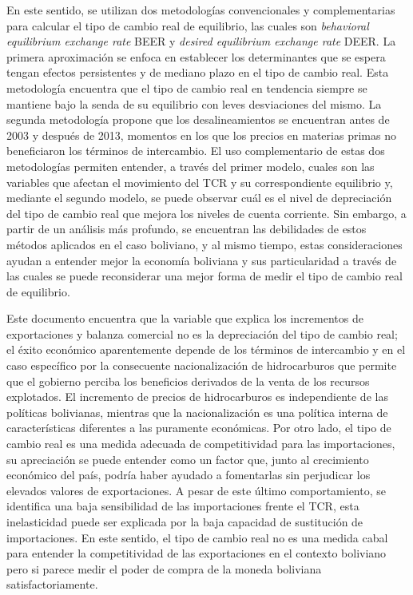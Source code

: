 \documentclass[12pt,letterpaper]{article}
\begin{document}
En este sentido, se utilizan dos metodologías convencionales y complementarias para calcular el tipo de cambio real de equilibrio, las cuales son \emph{behavioral equilibrium exchange rate} BEER y \emph{desired equilibrium exchange rate} DEER. La primera aproximación se enfoca en establecer los determinantes que se espera tengan efectos persistentes y de mediano plazo en el tipo de cambio real. Esta metodología encuentra que el tipo de cambio real en tendencia siempre se mantiene bajo la senda de su equilibrio con leves desviaciones del mismo. La segunda metodología propone que los desalineamientos se encuentran antes de 2003 y después de 2013, momentos en los que los precios en materias primas no beneficiaron los términos de intercambio. El uso complementario de estas dos metodologías permiten entender, a través del primer modelo, cuales son las variables que afectan el movimiento del TCR y su correspondiente equilibrio y, mediante el segundo modelo, se puede observar cuál es el nivel de depreciación del tipo de cambio real que mejora los niveles de cuenta corriente. Sin embargo, a partir de un análisis más profundo, se encuentran las debilidades de estos métodos aplicados en el caso boliviano, y al mismo tiempo, estas consideraciones ayudan a entender mejor la economía boliviana y sus particularidad a través de las cuales se puede reconsiderar una mejor forma de medir el tipo de cambio real de equilibrio.

Este documento encuentra que la variable que explica los incrementos de exportaciones y balanza comercial no es la depreciación del tipo de cambio real; el éxito económico aparentemente depende de los términos de intercambio y en el caso específico por la consecuente nacionalización de hidrocarburos que permite que el gobierno perciba los beneficios derivados de la venta de los recursos explotados. El incremento de precios de hidrocarburos es independiente de las políticas bolivianas, mientras que la nacionalización es una política interna de características diferentes a las puramente económicas. Por otro lado, el tipo de cambio real es una medida adecuada de competitividad para las importaciones, su apreciación se puede entender como un factor que, junto al crecimiento económico del país, podría haber ayudado a fomentarlas sin perjudicar los elevados valores de exportaciones. A pesar de este último comportamiento, se identifica una baja sensibilidad de las importaciones frente el TCR, esta inelasticidad puede ser explicada por la baja capacidad de sustitución de importaciones. En este sentido, el tipo de cambio real no es una medida cabal para entender la competitividad de las exportaciones en el contexto boliviano pero si parece medir el poder de compra de la moneda boliviana satisfactoriamente.
\end{document}
